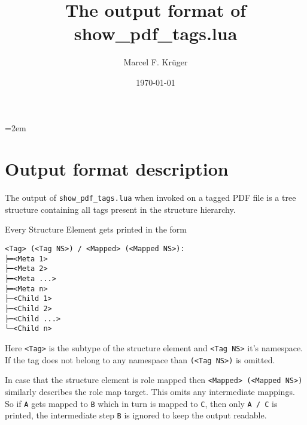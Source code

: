 \documentclass[8pt,a4paper]{article}
\title{The output format of show\_pdf\_tags.lua}
\author{Marcel F. Krüger}
\date{\today}
\begin{document}
\emergencystretch=2em
\maketitle
\section{Output format description}
The output of \texttt{show\_pdf\_tags.lua} when invoked on a tagged PDF file is a tree structure containing all tags present in the structure hierarchy.

Every Structure Element gets printed in the form
\begin{verbatim}
<Tag> (<Tag NS>) / <Mapped> (<Mapped NS>):
┝━<Meta 1>
┝━<Meta 2>
┝━<Meta ...>
┝━<Meta n>
├─<Child 1>
├─<Child 2>
├─<Child ...>
└─<Child n>
\end{verbatim}
Here \texttt{<Tag>} is the subtype of the structure element and \texttt{<Tag NS>} it's namespace.
If the tag does not belong to any namespace than \texttt{(<Tag NS>)} is omitted. 

In case that the structure element is role mapped then \texttt{<Mapped> (<Mapped NS>)} similarly describes the role map target.
This omits any intermediate mappings. So if \texttt{A} gets mapped to \texttt{B} which in turn is mapped to \texttt{C}, then
only \texttt{A / C} is printed, the intermediate step \texttt{B} is ignored to keep the output readable.
\end{document}
